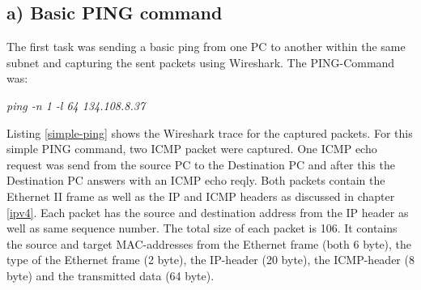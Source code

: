 \subsection{a) Basic PING command}
The first task was sending a basic ping from one PC to another within the same subnet and capturing the sent packets using Wireshark. The PING-Command was:
\begin{center}
	\textit{ping -n 1 -l 64 134.108.8.37}
\end{center}
Listing \ref{simple-ping} shows the Wireshark trace for the captured packets. For this simple PING command, two ICMP packet were captured. One ICMP echo request was send from the source PC to the Destination PC and after this the Destination PC answers with an ICMP echo reqly. Both packets contain the Ethernet II frame as well as the IP and ICMP headers as discussed in chapter \ref{ipv4}. Each packet has the source and destination address from the IP header as well as same sequence number. The total size of each packet is 106. It contains the source and target MAC-addresses from the Ethernet frame (both 6 byte), the type of the Ethernet frame (2 byte), the IP-header (20 byte), the ICMP-header (8 byte) and the transmitted data (64 byte).


